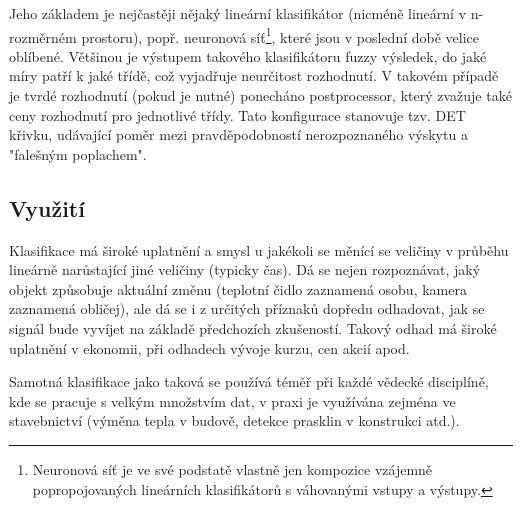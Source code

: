 
  Jeho základem je nejčastěji nějaký lineární klasifikátor (nicméně lineární v n-rozměrném prostoru),
  popř. neuronová síť\footnote{Neuronová síť je ve své podstatě vlastně jen kompozice vzájemně
  popropojovaných lineárních klasifikátorů s váhovanými vstupy a výstupy.}, které jsou v poslední době
  velice oblíbené. Většinou je výstupem takového klasifikátoru fuzzy výsledek, do jaké míry patří k
  jaké třídě, což vyjadřuje neurčitost rozhodnutí. V takovém případě je tvrdé rozhodnutí (pokud je nutné)
  ponecháno postprocessor, který zvažuje také ceny rozhodnutí pro jednotlivé třídy. Tato konfigurace
  stanovuje tzv. DET křivku, udávající poměr mezi pravděpodobností nerozpoznaného výskytu a
  "falešným poplachem". \cite{IKRclassification}

  \subsection{Využití}
  Klasifikace má široké uplatnění a smysl u jakékoli se měnící se veličiny v průběhu lineárně narůstající
  jiné veličiny (typicky čas). Dá se nejen rozpoznávat, jaký objekt způsobuje aktuální změnu
  (teplotní čidlo zaznamená osobu, kamera zaznamená obličej), ale dá se i z určitých příznaků
  dopředu odhadovat, jak se signál bude vyvíjet na základě předchozích zkušeností. Takový odhad
  má široké uplatnění v ekonomii, při odhadech vývoje kurzu, cen akcií apod.

  Samotná klasifikace jako taková se používá téměř při každé vědecké disciplíně, kde se pracuje
  s velkým množstvím dat, v praxi je využívána zejména ve stavebnictví (výměna tepla v budově,
  detekce prasklin v konstrukci atd.).

